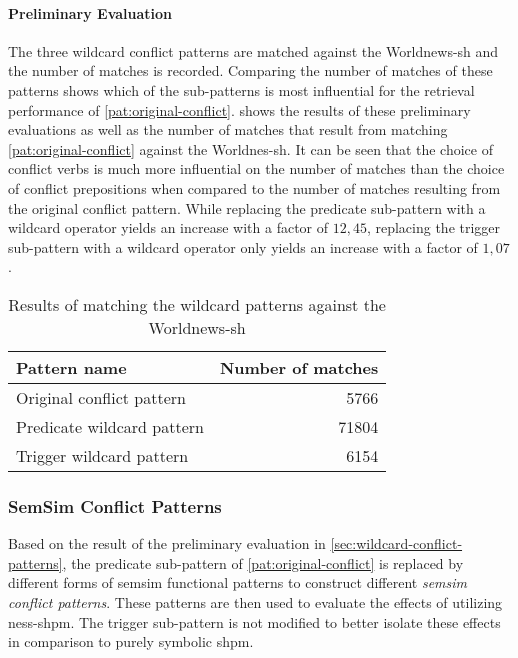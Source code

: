 \documentclass[11pt]{scrreprt}
\begin{document}
{\paragraph{Preliminary Evaluation}
The three wildcard conflict patterns are matched against the Worldnews-\gls{sh} and the number of matches is recorded. Comparing the number of matches of these patterns shows which of the sub-patterns is most influential for the retrieval performance of \cref{pat:original-conflict}.  shows the results of these preliminary evaluations as well as the number of matches that result from matching \cref{pat:original-conflict} against the Worldnes-\gls{sh}. It can be seen that the choice of conflict verbs is much more influential on the number of matches than the choice of conflict prepositions when compared to the number of matches resulting from the original conflict pattern. While replacing the predicate sub-pattern with a wildcard operator yields an increase with a factor of \(12,45\), replacing the trigger sub-pattern with a wildcard operator only yields an increase with a factor of \(1,07\). 


\begin{table}[h]
\centering
\begin{tabular}{lr}
\toprule
\multicolumn{1}{l}{Pattern name}				& \multicolumn{1}{l}{Number of matches} \\
\midrule
Original conflict pattern					& 5766	\\
Predicate wildcard pattern					& 71804 \\
Trigger wildcard pattern						& 6154	\\
\bottomrule
\end{tabular}
\caption{Results of matching the wildcard patterns against the Worldnews-\gls{sh}}
\label{tab:wildcard-pattern-evaluation}
\end{table}



\subsubsection{SemSim Conflict Patterns}
Based on the result of the preliminary evaluation in \cref{sec:wildcard-conflict-patterns}, the predicate sub-pattern of \cref{pat:original-conflict} is replaced by different forms of semsim functional patterns to construct different \textit{semsim conflict patterns}. These patterns are then used to evaluate the effects of utilizing \gls{ness-shpm}. The trigger sub-pattern is not modified to better isolate these effects in comparison to purely symbolic \gls{shpm}.

}
\end{document}
